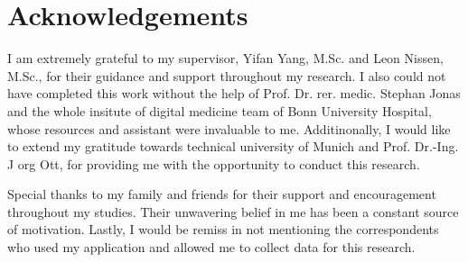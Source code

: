 \chapter*{Acknowledgements}

I am extremely grateful to my supervisor, Yifan Yang, M.Sc. and Leon Nissen, M.Sc., for their guidance and support throughout my research.
I also could not have completed this work without the help of Prof. Dr. rer. medic. Stephan Jonas and the whole insitute of digital medicine team of Bonn University Hospital, whose resources and assistant were invaluable to me.
Additinonally, I would like to extend my gratitude towards technical university of Munich and Prof. Dr.-Ing. J org Ott, for providing me with the opportunity to conduct this research.				

Special thanks to my family and friends for their support and encouragement throughout my studies.
Their unwavering belief in me has been a constant source of motivation.
Lastly, I would be remiss in not mentioning the correspondents who used my application and allowed me to collect data for this research.